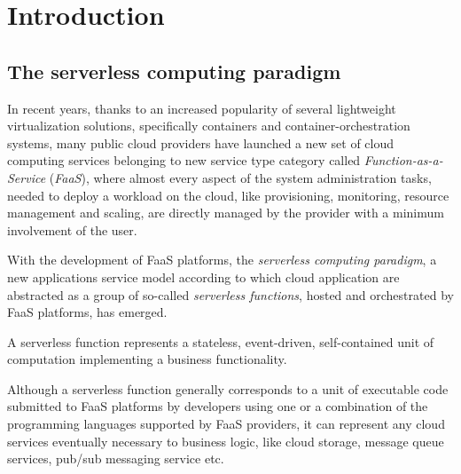 \documentclass[12pt,a4paper]{report}
\begin{document}
	
\begin{frontespizio} 
	
\end{frontespizio} 
	
	
\tableofcontents

\chapter{Introduction}

\section{The serverless computing paradigm}

In recent years, thanks to an increased popularity of several lightweight virtualization solutions, specifically containers and container-orchestration systems, many public cloud providers have launched a new set of cloud computing services belonging to new service type category called \textit{Function-as-a-Service} (\textit{FaaS}), where almost every aspect of the system administration tasks, needed to deploy a workload on the cloud, like provisioning, monitoring, resource management and scaling, are directly managed by the provider with a minimum involvement of the user.

With the development of FaaS platforms, the \textit{serverless computing paradigm}, a new applications service model according to which cloud application are abstracted as a group of so-called \textit{serverless functions}, hosted and orchestrated by FaaS platforms, has emerged. 

A serverless function represents a stateless, event-driven, self-contained unit of computation implementing a business functionality.

Although a serverless function generally corresponds to a unit of executable code submitted to FaaS platforms by developers using one or a combination of the programming languages supported by FaaS providers, it can represent any cloud services eventually necessary to business logic, like cloud storage, message queue services, pub/sub messaging service etc.
\end{document}
